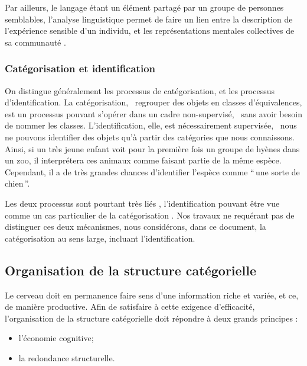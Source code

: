 {Par ailleurs, le langage étant un élément partagé par un groupe de personnes semblables, l'analyse linguistique permet de faire un lien entre la description de l'expérience sensible d'un individu, et les représentations mentales collectives de sa communauté \citep{dubois2000categories}.\\


\subsubsection{Catégorisation et identification}

On distingue généralement les processus de catégorisation, et les processus d'identification.  La catégorisation, \ie~regrouper des objets en classes d'équivalences, est un processus pouvant s'opérer dans un cadre non-supervisé, \ie~sans avoir besoin de nommer les classes. L'identification, elle, est nécessairement supervisée, \ie~nous ne pouvons identifier des objets qu'à partir des catégories que nous connaissons. Ainsi, si un très jeune enfant voit pour la première fois un groupe de hyènes dans un zoo, il interprétera ces animaux comme faisant partie de la même espèce. Cependant, il a de très grandes chances d’identifier l'espèce comme ``\,une sorte de chien\,''.

Les deux processus sont pourtant très liés \citep{goldstone2003concepts}, l'identification pouvant être vue comme un cas particulier de la catégorisation \citep{schyns1998diagnostic}. Nos travaux ne requérant pas de distinguer ces deux mécanismes, nous considérons, dans ce document, la catégorisation au sens large, incluant l'identification.

\subsection{Organisation de la structure catégorielle}

Le cerveau doit en permanence faire sens d'une information riche et variée, et ce, de manière productive. Afin de satisfaire à cette exigence d'efficacité, l'organisation de la structure catégorielle doit répondre à deux grands principes \citep[p. 29]{rosch1978cognition}:

\begin{itemize}
\item l'économie cognitive;
\item la redondance structurelle.
\end{itemize}

}
